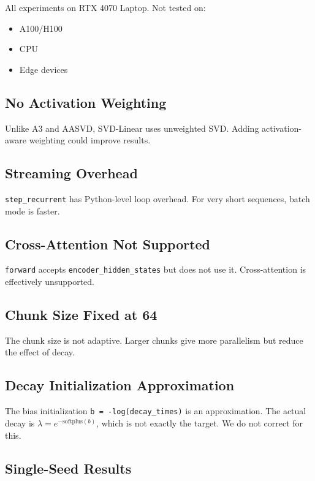 All experiments on RTX 4070 Laptop. Not tested on:
\begin{itemize}
\item A100/H100
\item CPU
\item Edge devices

\end{itemize}
\subsection{No Activation Weighting}

Unlike A3 and AASVD, SVD-Linear uses unweighted SVD. Adding activation-aware 
weighting could improve results.

\subsection{Streaming Overhead}

\texttt{step\_recurrent} has Python-level loop overhead. For very short sequences, 
batch mode is faster.

\subsection{Cross-Attention Not Supported}

\texttt{forward} accepts \texttt{encoder\_hidden\_states} but does not use it. Cross-attention 
is effectively unsupported.

\subsection{Chunk Size Fixed at 64}

The chunk size is not adaptive. Larger chunks give more parallelism but 
reduce the effect of decay.

\subsection{Decay Initialization Approximation}

The bias initialization \texttt{b = -log(decay\_times)} is an approximation. The 
actual decay is $\lambda = e^{-\text{softplus}(b)}$, which is not exactly 
the target. We do not correct for this.

\subsection{Single-Seed Results}

